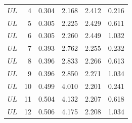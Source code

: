 \begin{longtable}{lrrrrr}
$UL$ & 4 & 0.304 & 2.168 & 2.412 & 0.216\\
$UL$ & 5 & 0.305 & 2.225 & 2.429 & 0.611\\
$UL$ & 6 & 0.305 & 2.260 & 2.449 & 1.032\\
$UL$ & 7 & 0.393 & 2.762 & 2.255 & 0.232\\
$UL$ & 8 & 0.396 & 2.833 & 2.266 & 0.613\\
$UL$ & 9 & 0.396 & 2.850 & 2.271 & 1.034\\
$UL$ & 10 & 0.499 & 4.010 & 2.201 & 0.241\\
$UL$ & 11 & 0.504 & 4.132 & 2.207 & 0.618\\
$UL$ & 12 & 0.506 & 4.175 & 2.208 & 1.034\\
\bottomrule\end{longtable}
